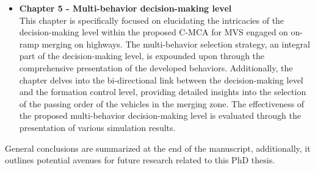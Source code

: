 \begin{itemize}
    
        \item \textbf{Chapter 5 - Multi-behavior decision-making level}\\
This chapter is specifically focused on elucidating the intricacies of the decision-making level within the proposed C-MCA for MVS engaged on on-ramp merging on highways. The multi-behavior selection strategy, an integral part of the decision-making level, is expounded upon through the comprehensive presentation of the developed behaviors. Additionally, the chapter delves into the bi-directional link between the decision-making level and the formation control level, providing detailed insights into the selection of the passing order of the vehicles in the merging zone. The effectiveness of the proposed multi-behavior decision-making level is evaluated through the presentation of various simulation results.  

\end{itemize}


General conclusions are summarized at the end of the manuscript, additionally,  it outlines potential avenues for future research related to this PhD thesis. 
